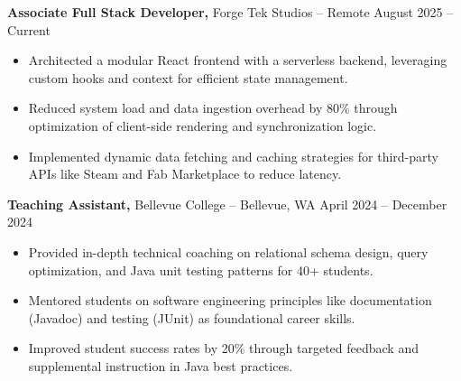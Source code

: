 \documentclass[11pt]{article}       %
\begin{document}
\textbf{Associate Full Stack Developer,} {Forge Tek Studios} -- Remote \hfill August 2025 -- Current 
\vspace{-9pt}
\begin{itemize}
  \item Architected a modular React frontend with a serverless backend, leveraging custom hooks and context for efficient state management.
  \item Reduced system load and data ingestion overhead by 80\% through optimization of client-side rendering and synchronization logic.
  \item Implemented dynamic data fetching and caching strategies for third-party APIs like Steam and Fab Marketplace to reduce latency.
\end{itemize}

\textbf{Teaching Assistant,} {Bellevue College} -- Bellevue, WA \hfill April 2024 -- December 2024 \\
\vspace{-9pt}
\begin{itemize}
  \item Provided in-depth technical coaching on relational schema design, query optimization, and Java unit testing patterns for 40+ students.
  \item Mentored students on software engineering principles like documentation (Javadoc) and testing (JUnit) as foundational career skills.
  \item Improved student success rates by 20\% through targeted feedback and supplemental instruction in Java best practices.
\end{itemize}

\end{document}
